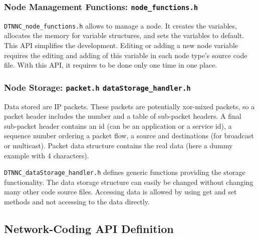 \documentclass[a4paper,twoside]{article}
\begin{document}


\subsubsection{Node Management Functions: \texttt{node\_functions.h}}

\texttt{DTNNC\_node\_functions.h} allows to manage a node. It creates the variables, allocates the memory for variable structures, and sets the variables to default. This API simplifies the development. Editing or adding a new node variable requires the editing and adding of this variable in each node type’s source code file. With this API, it requires to be done only one time in one place.



\subsubsection{Node Storage: \texttt{packet.h} \texttt{dataStorage\_handler.h}}

Data stored are IP packets. These packets are potentially xor-mixed packets, so a packet header includes the number and a table of sub-packet headers. A final sub-packet header contains an id (can be an application or a service id), a sequence number ordering a packet flow, a source and  destinations (for broadcast or multicast). Packet data structure contains the real data (here a dummy example with 4 characters).



\texttt{DTNNC\_dataStorage\_handler.h} defines generic functions providing the storage functionality. The data storage structure can easily be changed without changing many other code source files. Accessing data is allowed by using get and set methods and not accessing to the data directly.



\subsection{Network-Coding API Definition}
\label{section:nc-api}
\end{document}
